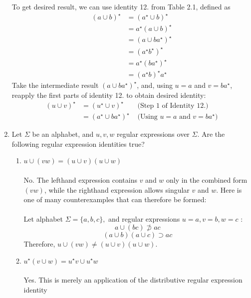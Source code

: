 \documentclass[12pt]{article}
\begin{document}
\begin{enumerate}
    \\ \\ To get desired result, we can use identity 12. from Table 2.1, defined as
    \begin{align*}
      (a \cup b)^\star &= (a^\star \cup b)^\star \\
                       &= a^{\star}(a \cup b)^\star \\
                       &= (a \cup ba^{\star})^\star \\
                       &= (a^{\star}b^{\star})^\star \\
                       &= a^{\star}(ba^{\star})^\star \\
                       &= (a^{\star}b)^{\star}a^\star 
    \end{align*}
    Take the intermediate result $(a \cup ba^{\star})^\star$, and, using $u = a$ and $v = ba^{\star}$, reapply the first parts of identity 12. to obtain desired identity:
    \begin{align*}
      (u \cup v)^\star &= (u^\star \cup v)^\star & \textrm{ (Step 1 of Identity 12.)} \\
                       &= (a^\star \cup ba^{\star})^\star & \textrm{ (Using $u = a$ and $v = ba^{\star}$)} 
    \end{align*}
\newpage
  \item Let $\Sigma$ be an alphabet, and $u, v, w$ regular expressions over $\Sigma$. Are the following regular expression identities true?
    \begin{enumerate}
      \item $ u \cup (vw) = (u \cup v)(u \cup w) $
        \\\\ No. The lefthand expression contains $v$ and $w$ only in the combined form $(vw)$, while the righthand expression allows singular $v$ and $w$. Here is one of many counterexamples that can therefore be formed:
        \\\\Let alphabet $ \Sigma = \{a,b,c\},$ and regular expressions $u = a, v = b, w = c$ :
        \[ a \cup (bc) \not\supset ac \]
        \[ (a \cup b)(a \cup c) \supset ac \]
        Therefore, $u \cup (vw) \not= (u \cup v)(u \cup w)$.\\
      \item $ u^{\star}(v \cup w) = u^{\star}v \cup u^{\star}w $
        \\\\ Yes. This is merely an application of the distributive regular expression identity

\end{enumerate}
\end{enumerate}
\end{document}
